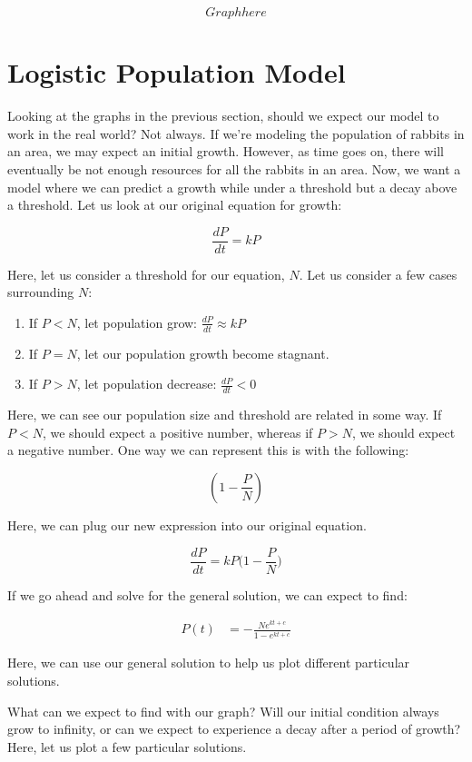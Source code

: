 \documentclass{amsart}
\theoremstyle{definition}
\numberwithin{equation}{section}
\begin{document}
\begin{sansmath}
\[ Graph here \]

\section{Logistic Population Model}

Looking at the graphs in the previous section, should we expect our model to work in the real world? Not always. If we're modeling the population of rabbits in an area, we may expect an initial growth. However, as time goes on, there will eventually be not enough resources for all the rabbits in an area. Now, we want a model where we can predict a growth while under a threshold but a decay above a threshold. Let us look at our original equation for growth:

\[ \frac{dP}{dt} = kP \]

Here, let us consider a threshold for our equation, $N$. Let us consider a few cases surrounding $N$:

\begin{enumerate}
  \item If $P < N$, let population grow: $\frac{dP}{dt} \approx kP$
  \item If $P = N$, let our population growth become stagnant.
  \item If $P > N$, let population decrease: $\frac{dP}{dt} < 0$
\end{enumerate}

Here, we can see our population size and threshold are related in some way. If $P < N$, we should expect a positive number, whereas if $P > N$, we should expect a negative number. One way we can represent this is with the following:

\[ (1 - \frac{P}{N} )\]

Here, we can plug our new expression into our original equation.

\[ \frac{dP}{dt} = kP \Big(1 - \frac{P}{N} \Big) \]

If we go ahead and solve for the general solution, we can expect to find:

\begin{align*}
  P(t) & = -\frac{Ne^{kt + c}}{1 - e^{kt + c}}
\end{align*}

Here, we can use our general solution to help us plot different particular solutions.

What can we expect to find with our graph? Will our initial condition always grow to infinity, or can we expect to experience a decay after a period of growth? Here, let us plot a few particular solutions. %


\end{sansmath}
\end{document}
